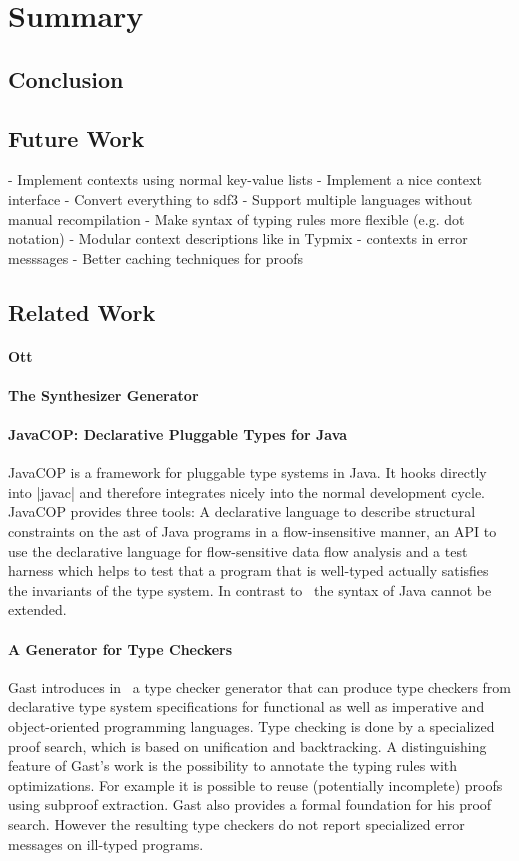 \chapter{Summary}
\section{Conclusion}
\section{Future Work}
- Implement contexts using normal key-value lists
- Implement a nice context interface
- Convert everything to sdf3
- Support multiple languages without manual recompilation
- Make syntax of typing rules more flexible (e.g. dot notation)
- Modular context descriptions like in Typmix
- contexts in error messsages
- Better caching techniques for proofs
\section{Related Work}
\subsubsection{Ott}
\subsubsection{The Synthesizer Generator}
\subsubsection{JavaCOP: Declarative Pluggable Types for Java}
JavaCOP \cite{Markstrum:2010:JDP:1667048.1667049} is a framework for
pluggable type systems in Java. It hooks directly into \code|javac|
and therefore integrates nicely into the normal development
cycle. JavaCOP provides three tools: A declarative language to
describe structural constraints on the \gls{ast} of Java programs in a
flow-insensitive manner, an API to use the declarative language for
flow-sensitive data flow analysis and a test harness which helps to
test that a program that is well-typed actually satisfies the
invariants of the type system. In contrast to~\cite{bergan2007typmix}
the syntax of Java cannot be extended.


\subsubsection{A Generator for Type Checkers}
Gast introduces in~\cite{gast2005generator} a type checker generator
that can produce type checkers from declarative type system
specifications for functional as well as imperative and
object-oriented programming languages. Type checking is done by a
specialized proof search, which is based on unification and
backtracking. A distinguishing feature of Gast's work is the
possibility to annotate the typing rules with optimizations. For
example it is possible to reuse (potentially incomplete) proofs using
subproof extraction. Gast also provides a formal foundation for his
proof search. However the resulting type checkers do not report
specialized error messages on ill-typed programs.

